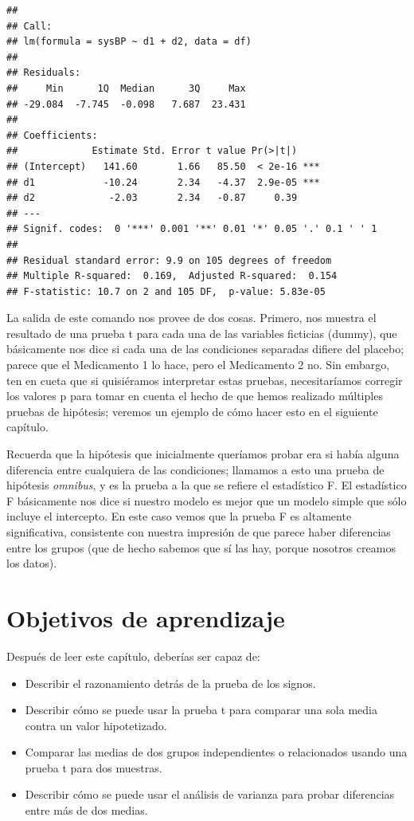 \documentclass[
  12pt,
]{book}
\providecommand{\tightlist}{%
  \setlength{\itemsep}{0pt}\setlength{\parskip}{0pt}}
\begin{document}
\begin{verbatim}
## 
## Call:
## lm(formula = sysBP ~ d1 + d2, data = df)
## 
## Residuals:
##     Min      1Q  Median      3Q     Max 
## -29.084  -7.745  -0.098   7.687  23.431 
## 
## Coefficients:
##             Estimate Std. Error t value Pr(>|t|)    
## (Intercept)   141.60       1.66   85.50  < 2e-16 ***
## d1            -10.24       2.34   -4.37  2.9e-05 ***
## d2             -2.03       2.34   -0.87     0.39    
## ---
## Signif. codes:  0 '***' 0.001 '**' 0.01 '*' 0.05 '.' 0.1 ' ' 1
## 
## Residual standard error: 9.9 on 105 degrees of freedom
## Multiple R-squared:  0.169,	Adjusted R-squared:  0.154 
## F-statistic: 10.7 on 2 and 105 DF,  p-value: 5.83e-05
\end{verbatim}

La salida de este comando nos provee de dos cosas. Primero, nos muestra el resultado de una prueba t para cada una de las variables ficticias (dummy), que básicamente nos dice si cada una de las condiciones separadas difiere del placebo; parece que el Medicamento 1 lo hace, pero el Medicamento 2 no. Sin embargo, ten en cueta que si quisiéramos interpretar estas pruebas, necesitaríamos corregir los valores p para tomar en cuenta el hecho de que hemos realizado múltiples pruebas de hipótesis; veremos un ejemplo de cómo hacer esto en el siguiente capítulo.

Recuerda que la hipótesis que inicialmente queríamos probar era si había alguna diferencia entre cualquiera de las condiciones; llamamos a esto una prueba de hipótesis \emph{omnibus}, y es la prueba a la que se refiere el estadístico F. El estadístico F básicamente nos dice si nuestro modelo es mejor que un modelo simple que sólo incluye el intercepto. En este caso vemos que la prueba F es altamente significativa, consistente con nuestra impresión de que parece haber diferencias entre los grupos (que de hecho sabemos que sí las hay, porque nosotros creamos los datos).

\hypertarget{objetivos-de-aprendizaje}{%
\section{Objetivos de aprendizaje}\label{objetivos-de-aprendizaje}}

Después de leer este capítulo, deberías ser capaz de:

\begin{itemize}
\tightlist
\item
  Describir el razonamiento detrás de la prueba de los signos.
\item
  Describir cómo se puede usar la prueba t para comparar una sola media contra un valor hipotetizado.
\item
  Comparar las medias de dos grupos independientes o relacionados usando una prueba t para dos muestras.
\item
  Describir cómo se puede usar el análisis de varianza para probar diferencias entre más de dos medias.
\end{itemize}
\end{document}

